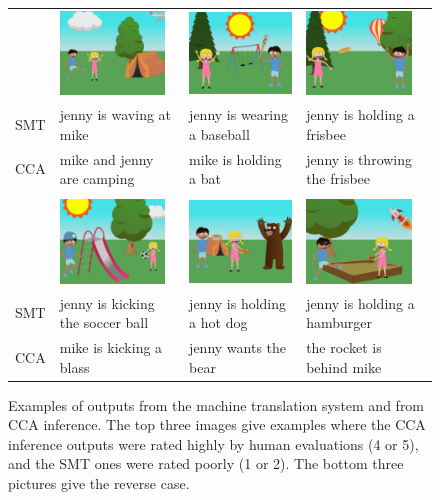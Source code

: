 \documentclass[letterpaper]{article}
\begin{document}
\begin{figure}[t]
\begin{center}
\begin{tabular}{llll}
& \includegraphics[width=1.1in]{Scene101_6.png} &
\includegraphics[width=1.1in]{Scene12_1.png} &
\includegraphics[width=1.1in]{Scene7_4.png} \\
SMT & jenny is waving at mike & jenny is wearing a baseball & jenny is holding a frisbee \\
CCA & mike and jenny are camping & mike is holding a bat & jenny is throwing the frisbee  \\
\\
& \includegraphics[width=1.1in]{Scene44_4.png} &
\includegraphics[width=1.1in]{Scene52_6.png} &
\includegraphics[width=1.1in]{Scene45_8.png} \\
SMT & jenny is kicking the soccer ball & jenny is holding a hot dog & jenny is holding a hamburger \\
CCA & mike is kicking a blass & jenny wants the bear & the rocket is behind mike
\end{tabular}
\end{center}
\caption{Examples of outputs from the machine translation system and from CCA inference. The top three images give examples where the CCA inference outputs were rated
highly by human evaluations (4 or 5), and the SMT ones were rated poorly (1 or 2). The bottom three pictures give the reverse case.\label{fig:examples}}
\end{figure}
\end{document}
